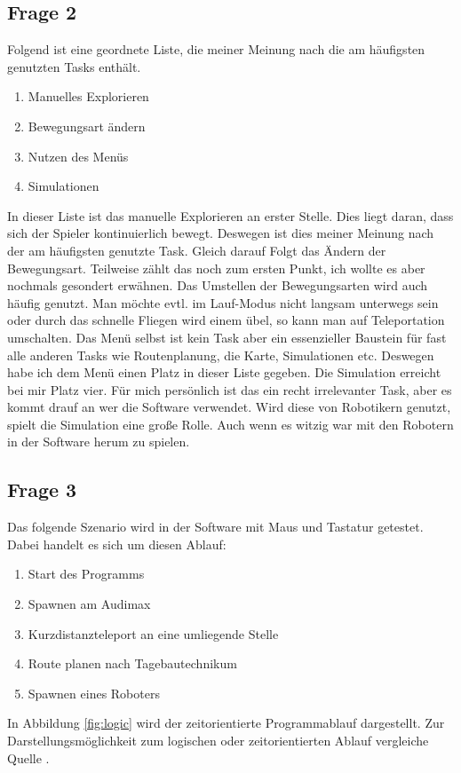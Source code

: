 \documentclass{TUBAFarbeiten}
\begin{document}
\subsection{Frage 2}
Folgend ist eine geordnete Liste, die meiner Meinung nach die am häufigsten genutzten Tasks enthält.
\begin{enumerate}
	\item Manuelles Explorieren
	\item Bewegungsart ändern
	\item Nutzen des Menüs
	\item Simulationen
\end{enumerate}
In dieser Liste ist das manuelle Explorieren an erster Stelle. Dies liegt daran, dass sich der Spieler kontinuierlich bewegt. Deswegen ist dies meiner Meinung nach der am  häufigsten genutzte Task. Gleich darauf Folgt das Ändern der Bewegungsart. Teilweise zählt das noch zum ersten Punkt, ich wollte es aber nochmals gesondert erwähnen. Das Umstellen der Bewegungsarten wird auch häufig genutzt. Man möchte evtl. im Lauf-Modus nicht langsam unterwegs sein oder durch das schnelle Fliegen wird einem übel, so kann man auf Teleportation umschalten. Das Menü selbst ist kein Task aber ein essenzieller Baustein für fast alle anderen Tasks wie Routenplanung, die Karte, Simulationen etc. Deswegen habe ich dem Menü einen Platz in dieser Liste gegeben. Die Simulation erreicht bei mir Platz vier. Für mich persönlich ist das ein recht irrelevanter Task, aber es kommt drauf an wer die Software verwendet. Wird diese von Robotikern genutzt, spielt die Simulation eine große Rolle. Auch wenn es witzig war mit den Robotern in der Software herum zu spielen.\\

\subsection{Frage 3}
Das folgende Szenario wird in der Software mit Maus und Tastatur getestet.
Dabei handelt es sich um diesen Ablauf:
\begin{enumerate}
	\item Start des Programms
	\item Spawnen am Audimax
	\item Kurzdistanzteleport an eine umliegende Stelle
	\item Route planen nach Tagebautechnikum  
	\item Spawnen eines Roboters
\end{enumerate}
In Abbildung \ref{fig:logic} wird der zeitorientierte Programmablauf dargestellt. Zur Darstellungsmöglichkeit zum logischen oder zeitorientierten Ablauf vergleiche Quelle \cite[S. 80-82]{ISB2}.
\end{document}
